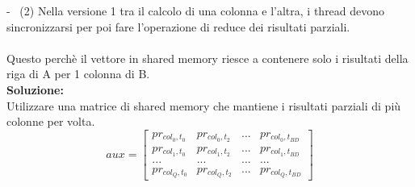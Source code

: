 \documentclass[compress]{beamer}
\begin{document}
\begin{frame}{\secname \text{ }- \subsecname\ (2)}
    Nella versione 1 tra il calcolo di una colonna e l'altra, i thread devono sincronizzarsi per poi fare l'operazione di reduce dei risultati parziali. \\ \\
    Questo perchè il vettore in shared memory riesce a contenere solo i risultati della riga di A per 1 colonna di B. \\
    
    \textbf{Soluzione:} \\
    Utilizzare una matrice di shared memory che mantiene i risultati parziali di più colonne per volta.
   \[
        aux = \left[
        \begin{matrix}
        pr_{col_0, t_0} & pr_{col_0, t_2} & ... & pr_{col_0, t_{BD}} \\
        pr_{col_1, t_0} & pr_{col_1, t_2} & ... & pr_{col_1, t_{BD}} \\
        ... & ... & ... & ... \\
        pr_{col_{Q}, t_0} & pr_{col_{Q}, t_2} & ... & pr_{col_{Q}, t_{BD}}
        \end{matrix}\right]
    \]
\end{frame}
\end{document}
